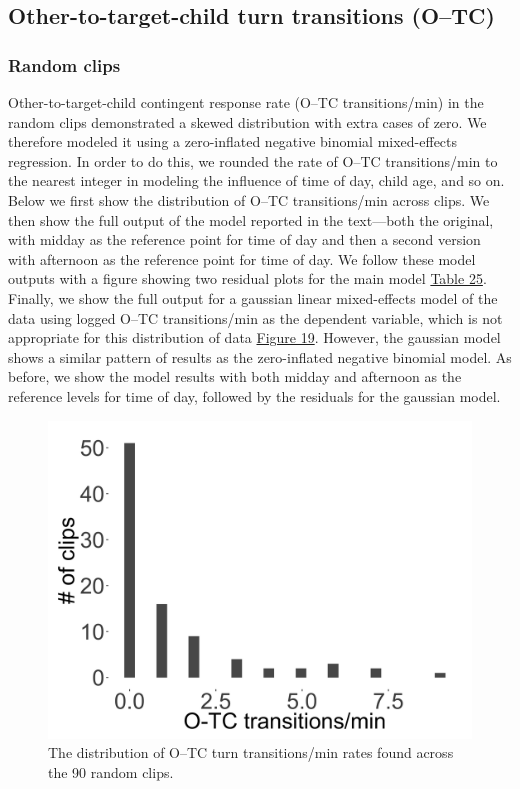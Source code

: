 \documentclass[floatsintext,man]{apa6}
\theoremstyle{definition}
\theoremstyle{definition}
\theoremstyle{definition}
\theoremstyle{remark}
\begin{document}
\newpage

\subsection{Other-to-target-child turn transitions
(O--TC)}\label{models-o_tc}

\subsubsection{Random clips}\label{models-o_tc-random}

Other-to-target-child contingent response rate (O--TC transitions/min)
in the random clips demonstrated a skewed distribution with extra cases
of zero. We therefore modeled it using a zero-inflated negative binomial
mixed-effects regression. In order to do this, we rounded the rate of
O--TC transitions/min to the nearest integer in modeling the influence
of time of day, child age, and so on. Below we first show the
distribution of O--TC transitions/min across clips. We then show the
full output of the model reported in the text---both the original, with
midday as the reference point for time of day and then a second version
with afternoon as the reference point for time of day. We follow these
model outputs with a figure showing two residual plots for the main
model \protect\hyperlink{tab25}{Table 25}. Finally, we show the full
output for a gaussian linear mixed-effects model of the data using
logged O--TC transitions/min as the dependent variable, which is not
appropriate for this distribution of data
\protect\hyperlink{fig19}{Figure 19}. However, the gaussian model shows
a similar pattern of results as the zero-inflated negative binomial
model. As before, we show the model results with both midday and
afternoon as the reference levels for time of day, followed by the
residuals for the gaussian model.

\begin{figure}

{\centering \includegraphics[width=0.4\linewidth]{www/o_c_tpm_random_distribution} 

}

\caption{The distribution of O--TC turn transitions/min rates found across the 90 random clips.}\label{fig:fig19}
\end{figure}
\end{document}
